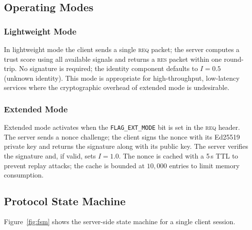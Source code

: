 \documentclass[10pt,conference]{IEEEtran}
\begin{document}
\subsection{Operating Modes}

\subsubsection{Lightweight Mode}

In lightweight mode the client sends a single \textsc{req} packet;
the server computes a trust score using all available signals and
returns a \textsc{res} packet within one round-trip.  No signature
is required; the identity component defaults to $I = 0.5$ (unknown
identity).  This mode is appropriate for high-throughput, low-latency
services where the cryptographic overhead of extended mode is
undesirable.

\subsubsection{Extended Mode}

Extended mode activates when the \texttt{FLAG\_EXT\_MODE} bit is set
in the \textsc{req} header.  The server sends a nonce challenge; the
client signs the nonce with its Ed25519 private key and returns the
signature along with its public key.  The server verifies the signature
and, if valid, sets $I = 1.0$.  The nonce is cached with a 5\,s TTL
to prevent replay attacks; the cache is bounded at $10{,}000$ entries
to limit memory consumption.

\subsection{Protocol State Machine}

Figure~\ref{fig:fsm} shows the server-side state machine for a single
client session.
\end{document}
